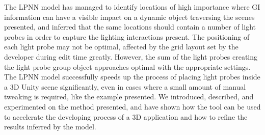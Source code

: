 The LPNN model has managed to identify locations of high importance where GI information can have a visible impact on a dynamic object traversing the scenes presented, and inferred that the same locations should contain a number of light probes in order to capture the lighting interactions present. The positioning of each light probe may not be optimal, affected by the grid layout set by the developer during edit time greatly. However, the sum of the light probes creating the light probe group object approaches optimal with the appropriate settings. The LPNN model successfully speeds up the process of placing light probes inside a 3D Unity scene significantly, even in cases where a small amount of manual tweaking is required, like the example presented. We introduced, described, and experimented on the method presented, and have shown how the tool can be used to accelerate the developing process of a 3D application and how to refine the results inferred by the model.